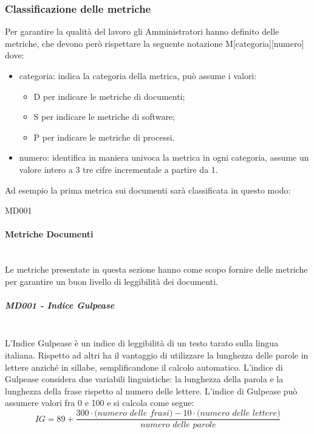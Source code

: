 \subsubsection{Classificazione delle metriche}
Per garantire la qualità del lavoro gli Amministratori hanno definito delle metriche, che devono però rispettare la seguente notazione M[categoria][numero] dove:
\begin{itemize}
	\item{categoria}: indica la categoria della metrica, può assume i valori:
	\begin{itemize}
		\item D per indicare le metriche di documenti;
		\item S per indicare le metriche di software;
		\item P per indicare le metriche di processi.
	\end{itemize}
	\item{numero}: identifica in maniera univoca la metrica in ogni categoria, assume un valore intero a 3 tre cifre incrementale a partire da 1.
\end{itemize}
Ad esempio la prima metrica sui documenti sarà classificata in questo modo:
\begin{center}
	MD001
\end{center}

\paragraph{Metriche Documenti}\mbox{}\\
Le metriche presentate in questa sezione hanno come scopo fornire delle metriche per garantire un buon livello di leggibilità dei documenti.


\subparagraph{MD001 - Indice Gulpease}\mbox{}\\
L'Indice Gulpease è un indice di leggibilità di un testo tarato sulla lingua italiana. Rispetto ad altri ha il vantaggio di utilizzare la lunghezza delle parole in lettere anziché in sillabe, semplificandone il calcolo automatico.
L'indice di Gulpease considera due variabili linguistiche: la lunghezza della parola e la lunghezza della frase rispetto al numero delle lettere.
L'indice di Gulpease può assumere valori fra 0 e 100 e si calcola come segue:
\[
IG = 89 + \frac{300 \cdot \textit{(numero delle frasi)} - 10 \cdot \textit{(numero delle lettere)}}{\textit{numero delle parole}}
\]

